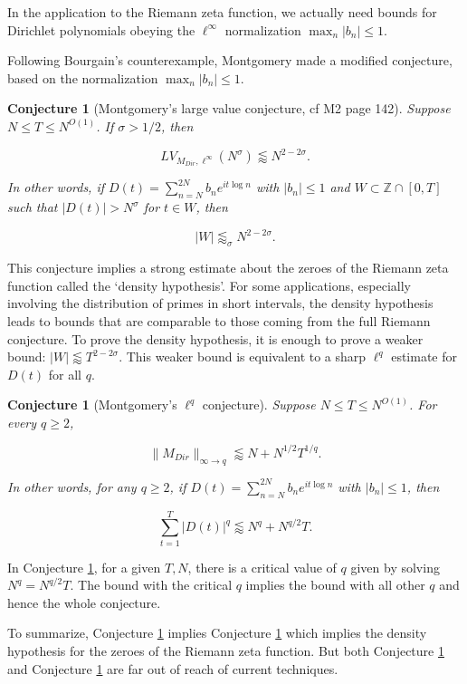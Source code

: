 \documentclass{amsart}
\newtheorem{conj}[prop]{Conjecture}
\newcommand{\ZZ}{\mathbb{Z}}
\begin{document}
In the application to the Riemann zeta function,  we actually need bounds for Dirichlet polynomials obeying the $\ell^\infty$ normalization $\max_n |b_n| \le 1$. 

Following Bourgain's counterexample,  Montgomery made a modified conjecture,  based on the normalization $\max_n |b_n| \le 1$.

\begin{conj}[Montgomery's large value conjecture, cf {M2} page 142] \label{conjMontgomery} Suppose $N \le T \le N^{O(1)}$.  If $\sigma > 1/2$,  then

$$LV_{M_{Dir},  \ell^\infty}(N^\sigma) \lessapprox N^{2 - 2 \sigma}. $$

In other words, if $D(t) = \sum_{n=N}^{2N} b_n e^{i t \log n}$ with $|b_n| \le 1$ and $W \subset \ZZ \cap [0,T] $ such that $|D(t)| > N^\sigma$ for $t\in W$,  then

\[
|W| \lessapprox_\sigma N^{2 - 2 \sigma}.
\]

\end{conj}

This conjecture implies a strong estimate about the zeroes of the Riemann zeta function called the `density hypothesis'.  For some applications, especially involving the distribution of primes in short intervals, the density hypothesis leads to bounds that are comparable to those coming from the full Riemann conjecture.  To prove the density hypothesis, it is enough to prove a weaker bound: $|W| \lessapprox T^{2 - 2 \sigma}$.  This weaker bound is equivalent to a sharp $\ell^q$ estimate for $D(t)$ for all $q$.

\begin{conj}[Montgomery's $\ell^q$ conjecture] \label{conjMontgomerylq} Suppose $N \le T \le N^{O(1)}$.  For every $q \ge 2$, 

$$ \| M_{Dir} \|_{\infty \rightarrow q} \lessapprox N + N^{1/2} T^{1/q}. $$

In other words,  for any $q \ge 2$, if $D(t) = \sum_{n=N}^{2N} b_n e^{i t \log n}$ with $|b_n| \le 1$,  then

$$ \sum_{t =1}^T |D(t)|^q \lessapprox N^q + N^{q/2} T. $$

\end{conj}

In Conjecture \ref{conjMontgomerylq},  for a given $T, N$, there is a critical value of $q$ given by solving $N^q = N^{q/2} T$.   The bound with the critical $q$ implies the bound with all other $q$ and hence the whole conjecture.  

To summarize,  Conjecture \ref{conjMontgomery} implies Conjecture \ref{conjMontgomerylq} which implies the density hypothesis for the zeroes of the Riemann zeta function.  But both Conjecture \ref{conjMontgomery} and Conjecture \ref{conjMontgomerylq} are far out of reach of current techniques.
\end{document}
